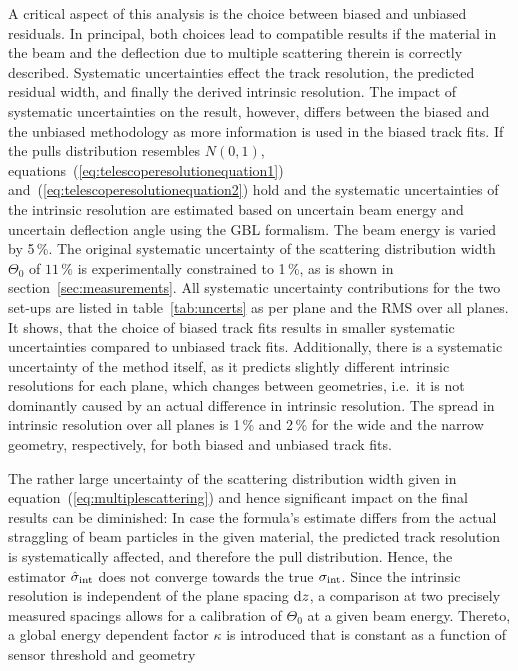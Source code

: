 A critical aspect of this analysis is the choice between biased and unbiased residuals. 
In principal, both choices lead to compatible results if the material in the beam and the deflection due to multiple scattering therein is correctly described. 
Systematic uncertainties effect the track resolution, the predicted residual width, and finally the derived intrinsic resolution. 
The impact of systematic uncertainties on the result, however, differs between the biased and the unbiased methodology as more information is used in the biased track fits. 
If the pulls distribution resembles $N(0,1)$, equations~(\ref{eq:telescoperesolutionequation1}) and~(\ref{eq:telescoperesolutionequation2}) hold and the systematic uncertainties of the intrinsic resolution
 are estimated based on uncertain beam energy and uncertain deflection angle using the GBL formalism. 
The beam energy is varied by 5\,\%. 
The original systematic uncertainty of the scattering distribution width $\Theta_{0}$ of $11\,\%$ is experimentally constrained to 1\,\%, as is shown in section~\ref{sec:measurements}. 
All systematic uncertainty contributions for the two set-ups are listed in table~\ref{tab:uncerts} as per plane and the RMS over all planes. 
It shows, that the choice of biased track fits results in smaller systematic uncertainties compared to unbiased track fits. 
Additionally, there is a systematic uncertainty of the method itself, as it predicts slightly different intrinsic resolutions for each plane, which changes between geometries,
 i.e.\ it is not dominantly caused by an actual difference in intrinsic resolution. 
The spread in intrinsic resolution over all planes is 1\,\% and 2\,\% for the wide and the narrow geometry, respectively, for both biased and unbiased track fits. 

The rather large uncertainty of the scattering distribution width given in equation~(\ref{eq:multiplescattering}) and hence significant impact on the final results can be diminished: 
In case the formula's estimate differs from the actual straggling of beam particles in the given material, the predicted track resolution is systematically affected, and therefore the pull distribution. 
Hence, the estimator $\hat{\sigma}_{\textrm{int}}$ does not converge towards the true $\sigma_{\textrm{int}}$. 
Since the intrinsic resolution is independent of the plane spacing $\textrm{d}z$, a comparison at two precisely measured spacings allows for a calibration of $\Theta_0$ at a given beam energy. 
Thereto, a global energy dependent factor $\kappa$ is introduced that is constant as a function of sensor threshold and geometry

